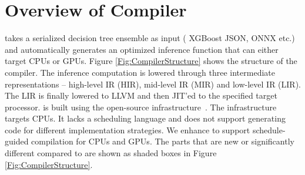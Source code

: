 \section{Overview of \Treebeard{} Compiler}


\Treebeard{} takes a serialized decision tree ensemble as input (
XGBoost JSON, ONNX etc.) and automatically generates an optimized inference function
that can either target CPUs or GPUs. 
Figure \ref{Fig:CompilerStructure} shows the structure of the \Treebeard{} compiler. 
The inference computation is lowered through three intermediate representations
-- high-level IR (HIR), mid-level IR (MIR) and low-level IR (LIR). The LIR is
finally lowered to LLVM and then JIT'ed to the specified target processor. 
\Treebeard{} is built using the open-source \TreebeardOLD{} infrastructure~\cite{Treebeard}.
The \TreebeardOLD{} infrastructure targets CPUs.
It lacks a scheduling language and does not support generating code for 
different implementation strategies. We enhance \TreebeardOLD{}  
to support schedule-guided compilation for CPUs and GPUs.
The parts \Treebeard{} that are new or significantly different compared to \TreebeardOLD{}
are shown as shaded boxes in Figure \ref{Fig:CompilerStructure}.


